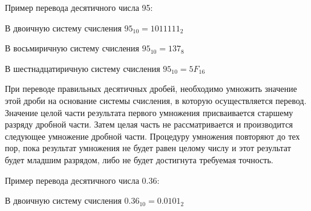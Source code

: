 \documentclass[a4paper]{article}
\begin{document}
Пример перевода десятичного числа 95:

В двоичную систему счисления $95_{10}=1011111_{2}$
\begin{figure}[h]
\end{figure}


В восьмиричную систему счисления $95_{10}=137_{8}$
\begin{figure}[h]
\end{figure}

В шестнадцатиричную систему счисления $95_{10}=5F_{16}$
\begin{figure}[h]
\end{figure}

При переводе правильных десятичных дробей, необходимо умножить значение этой дроби на основание системы счисления, в которую осуществляется перевод. Значение целой части результата первого умножения присваивается старшему разряду дробной части. Затем целая часть не рассматривается и производится следующее умножение дробной части. Процедуру умножения повторяют до тех пор, пока результат умножения не будет равен целому числу и этот результат будет младшим разрядом, либо не будет достигнута требуемая точность.

Пример перевода десятичного числа 0.36:

В двоичную систему счисления $0.36_{10}=0.0101_{2}$
\begin{figure}[h]
\end{figure}
\end{document}
